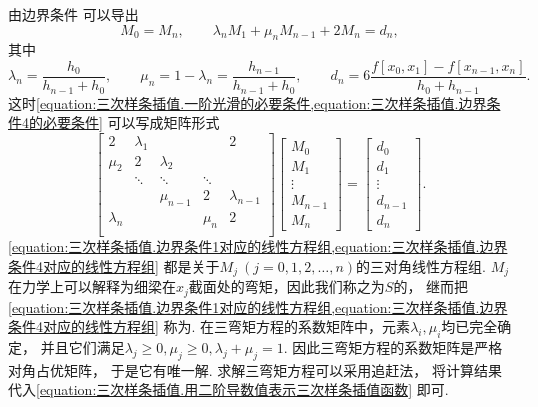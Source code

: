由边界条件  可以导出\begin{equation}\label{equation:三次样条插值.边界条件4的必要条件}
	M_0 = M_n,
	\qquad
	\lambda_n M_1 + \mu_n M_{n-1} + 2 M_n = d_n,
\end{equation}
其中\begin{equation*}
	\lambda_n = \frac{h_0}{h_{n-1} + h_0},
	\qquad
	\mu_n = 1 - \lambda_n
	= \frac{h_{n-1}}{h_{n-1} + h_0},
	\qquad
	d_n = 6 \frac{f[x_0,x_1] - f[x_{n-1},x_n]}{h_0 + h_{n-1}}.
\end{equation*}
这时\cref{equation:三次样条插值.一阶光滑的必要条件,equation:三次样条插值.边界条件4的必要条件}
可以写成矩阵形式\begin{equation}\label{equation:三次样条插值.边界条件4对应的线性方程组}
	\begin{bmatrix}
		2 & \lambda_1 &&& 2 \\
		\mu_2 & 2 & \lambda_2 \\
		& \ddots & \ddots & \ddots \\
		&& \mu_{n-1} & 2 & \lambda_{n-1} \\
		\lambda_n &&& \mu_n & 2 \\
	\end{bmatrix}
	\begin{bmatrix}
		M_0 \\ M_1 \\ \vdots \\ M_{n-1} \\ M_n
	\end{bmatrix}
	= \begin{bmatrix}
		d_0 \\ d_1 \\ \vdots \\ d_{n-1} \\ d_n
	\end{bmatrix}.
\end{equation}
\cref{equation:三次样条插值.边界条件1对应的线性方程组,equation:三次样条插值.边界条件4对应的线性方程组}
都是关于\(M_j\ (j=0,1,2,\dotsc,n)\)的三对角线性方程组.
\(M_j\)在力学上可以解释为细梁在\(x_j\)截面处的弯矩，因此我们称之为\(S\)的，
继而把\cref{equation:三次样条插值.边界条件1对应的线性方程组,equation:三次样条插值.边界条件4对应的线性方程组}
称为.
在三弯矩方程的系数矩阵中，元素\(\lambda_i,\mu_i\)均已完全确定，
并且它们满足\(
	\lambda_j \geq 0,
	\mu_j \geq 0,
	\lambda_j + \mu_j = 1
\).
因此三弯矩方程的系数矩阵是严格对角占优矩阵，
于是它有唯一解.
求解三弯矩方程可以采用追赶法，
将计算结果代入\cref{equation:三次样条插值.用二阶导数值表示三次样条插值函数} 即可.

